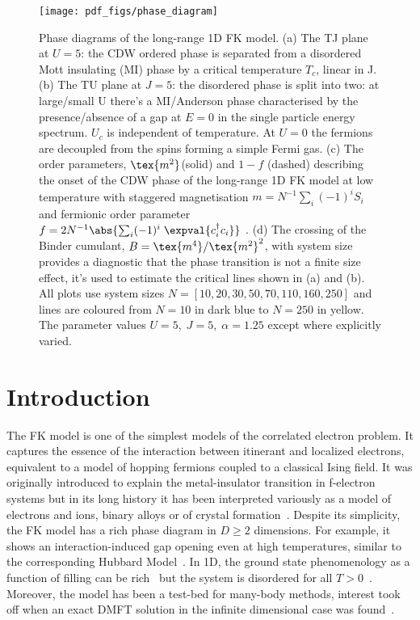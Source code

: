 \begin{figure}[!ht]
  \centering
    \texttt{[image: pdf\_figs/phase\_diagram]}
  \caption{\label{fig:phase_diagram} Phase diagrams of the long-range 1D \ac{FK} model. (a) The TJ plane at \(U = 5\): the \ac{CDW} ordered phase is separated from a disordered Mott insulating (MI) phase by a critical temperature \(T_c\), linear in J. (b) The TU plane at \(J = 5\): the disordered phase is split into two: at large/small U there's a MI/Anderson phase characterised by the presence/absence of a gap at \(E=0\) in the single particle energy spectrum. \(U_c\) is independent of temperature. At \(U = 0\) the fermions are decoupled from the spins forming a simple Fermi gas. (c) The order parameters, \(\tex{m^2}\)(solid) and \(1 - f\) (dashed) describing the onset of the \ac{CDW} phase of the long-range 1D \ac{FK} model at low temperature with staggered magnetisation \(m = N^{-1} \sum_i (-1)^i S_i\) and fermionic order parameter \(f = 2 N^{-1}\abs{\sum_i (-1)^i \; \expval{c^\dag_{i}c_{i}}}\) . (d) The crossing of the Binder cumulant, \(B = \tex{m^4} / \tex{m^2}^2\), with system size provides a diagnostic that the phase transition is not a finite size effect, it's used to estimate the critical lines shown in (a) and (b). All plots use system sizes \(N = [10,20,30,50,70,110,160,250]\) and lines are coloured from \(N = 10\) in dark blue to \(N = 250\) in yellow. The parameter values \(U = 5,\;J = 5,\;\alpha = 1.25\) except where explicitly varied.}
\end{figure}

\section{Introduction}
The \acl{FK} model is one of the simplest models of the correlated electron problem. It captures the essence of the interaction between itinerant and localized electrons, equivalent to a model of hopping fermions coupled to a classical Ising field. It was originally introduced to explain the metal-insulator transition in f-electron systems but in its long history it has been interpreted variously as a model of electrons and ions, binary alloys or of crystal formation~\cite{hubbardj.ElectronCorrelationsNarrow1963, falicovSimpleModelSemiconductorMetal1969,gruberFalicovKimballModelReview1996,gruberFalicovKimballModel2006}. Despite its simplicity, the \ac{FK} model has a rich phase diagram in \(D \geq 2\) dimensions. For example, it shows an interaction-induced gap opening even at high temperatures, similar to the corresponding Hubbard Model~\cite{brandtThermodynamicsCorrelationFunctions1989}.  In 1D, the ground state phenomenology as a function of filling can be rich~\cite{gruberGroundStatesSpinless1990} but the system is disordered for all \(T > 0\)~\cite{kennedyItinerantElectronModel1986}. Moreover, the model has been a test-bed for many-body methods, interest took off when an exact DMFT solution in the infinite dimensional case was found~\cite{antipovCriticalExponentsStrongly2014,ribicNonlocalCorrelationsSpectral2016,freericksExactDynamicalMeanfield2003,herrmannNonequilibriumDynamicalCluster2016}. 

